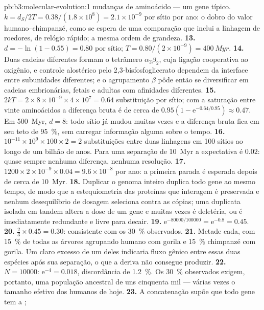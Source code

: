 \begin{solution}{pb:b3:molecular-evolution:1}
mudanças de aminoácido --- um gene típico. $k = d_{S}/2T = 0.38/(1.8\times
10^{8}) = 2.1\times 10^{-9}$ por sítio por ano: o dobro do
valor humano--chimpanzé, como se espera de uma comparação que inclui a
linhagem de roedores, de relógio rápido; a mesma ordem de grandeza.
\textbf{13.} $d = -\ln(1 - 0.55) = 0.80$ por sítio; $T = 0.80/(2\times
10^{-9}) = \qty{400}{Myr}$.
\textbf{14.} Duas cadeias diferentes formam o tetrâmero
$\alpha_{2}\beta_{2}$, cuja ligação cooperativa ao oxigênio, 
e controle alostérico pelo 2,3-bisfosfoglicerato dependem da interface
entre subunidades diferentes; e o agrupamento $\beta$ pôde então se
diversificar em cadeias embrionárias, fetais e adultas com afinidades
diferentes.
\textbf{15.} $2kT = 2\times 8\times 10^{-9}\times 4\times 10^{7} = 0.64$
substituição por sítio; com a saturação entre vinte aminoácidos a
diferença bruta é de cerca de $0.95(1 - \mathrm{e}^{-0.64/0.95}) \approx 0.47$. Em \qty{500}{Myr}, $d = 8$: todo sítio já mudou muitas vezes e a
diferença bruta fica em seu teto de \qty{95}{\%}, sem carregar informação
alguma sobre o tempo.
\textbf{16.} $10^{-11}\times 10^{9}\times 100\times 2 = 2$ substituições
entre duas linhagens em 100 sítios ao longo de um bilhão de anos. Para
uma separação de \qty{10}{Myr} a expectativa é $0.02$: quase sempre
nenhuma diferença, nenhuma resolução.
\textbf{17.} $1200\times 2\times 10^{-9}\times 0.04 = 9.6\times 10^{-8}$
por ano: a primeira parada é esperada depois de cerca de \qty{10}{Myr}.
\textbf{18.} Duplicar o genoma inteiro duplica todo gene ao mesmo tempo,
de modo que a estequiometria das proteínas que interagem é preservada e
nenhum desequilíbrio de dosagem seleciona contra as cópias; uma duplicata
isolada em tandem altera a dose de um gene e muitas vezes é deletéria,
ou é imediatamente redundante e livre para decair.
\textbf{19.} $\mathrm{e}^{-\num{80000}/\num{100000}} = \mathrm{e}^{-0.8} = 0.45$.
\textbf{20.} $\tfrac{2}{3}\times 0.45 = 0.30$: consistente com os
\qty{30}{\%} observados.
\textbf{21.} Metade cada, com \qty{15}{\%} de todas as árvores agrupando
humano com gorila e \qty{15}{\%} chimpanzé com gorila. Um claro excesso
de um deles indicaria fluxo gênico entre essas duas espécies após sua
separação, o que a deriva não consegue produzir.
\textbf{22.} $N = \num{10000}$: $\mathrm{e}^{-4} = 0.018$, discordância de
\qty{1.2}{\%}. Os \qty{30}{\%} observados exigem, portanto, uma população
ancestral de uns cinquenta mil --- várias vezes o tamanho efetivo dos
humanos de hoje.
\textbf{23.} A concatenação supõe que todo gene tem a ;

\end{solution}
